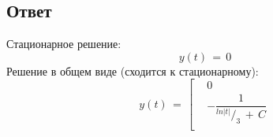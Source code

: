 \documentclass{article}
\newcommand*\rfrac[2]{{}^{#1}\!/_{#2}}
\begin{document}
\subsection*{Ответ}
Стационарное решение:
\[ y(t) \, = \, 0 \]
Решение в общем виде (сходится к стационарному):
\begin{equation*}
y(t) \, = \, 
\left[
\begin{aligned}
& 0 \\
& -\dfrac{1}{\rfrac{ln|t|}{3} \, + \, C} \\
\end{aligned}
\right.
\end{equation*}
\end{document}
